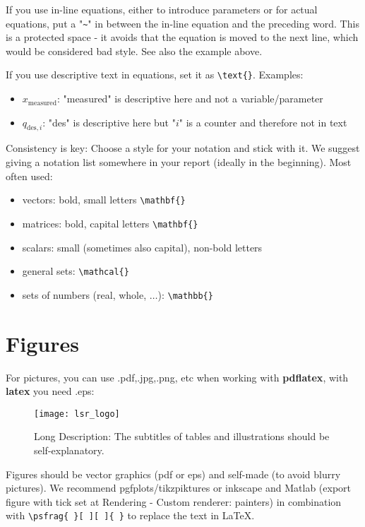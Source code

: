 If you use in-line equations, either to introduce parameters or for actual equations, put a "\verb|~|" in between the in-line equation and the preceding word. This is a protected space - it avoids that the equation is moved to the next line, which would be considered bad style. See also the example above.

If you use descriptive text in equations, set it as \verb|\text{}|. Examples:
\begin{itemize}
	\item $x_{\text{measured}}$: "measured" is descriptive here and not a variable/parameter 
	\item $q_{\text{des},i}$: "des" is descriptive here but "$i$" is a counter and therefore not in text 
\end{itemize}

Consistency is key: Choose a style for your notation and stick with it. We suggest giving a notation list somewhere in your report (ideally in the beginning). 
Most often used:
\begin{itemize}
	\item vectors: bold, small letters \verb|\mathbf{}|
	\item matrices: bold, capital letters \verb|\mathbf{}|
	\item scalars: small (sometimes also capital), non-bold letters
	\item general sets: \verb|\mathcal{}|
	\item sets of numbers (real, whole, $\ldots$): \verb|\mathbb{}|
\end{itemize}

\section{Figures}

For pictures, you can use .pdf,.jpg,.png, etc when working with \textbf{pdflatex}, with \textbf{latex} you need .eps:
\begin{figure}[htb]
\centering
\texttt{[image: lsr\_logo]}
\caption[Abbreviated Description]{Long Description: The subtitles of tables and illustrations should be self-explanatory.}
\label{fig:abb1}
\end{figure}

Figures should be vector graphics (pdf or eps) and self-made (to avoid blurry pictures). We recommend pgfplots/tikzpiktures or inkscape and Matlab (export figure with tick set at Rendering - Custom renderer: painters) in combination with \verb|\psfrag{ }[ ][ ]{ }| to replace the text in \LaTeX.

